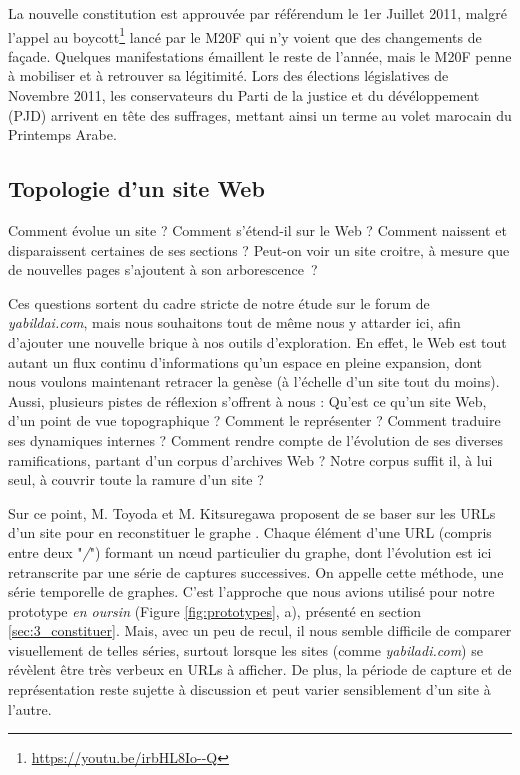 \documentclass[symmetric,justified,marginals=raggedouter]{tufte-book}
\begin{document}
La nouvelle constitution est approuvée par référendum le 1er Juillet 2011, malgré l'appel au boycott\footnote{\url{https://youtu.be/irbHL8Io--Q}} lancé par le M20F qui n'y voient que des changements de façade. Quelques manifestations émaillent le reste de l'année, mais le M20F penne à mobiliser et à retrouver sa légitimité. Lors des élections législatives de Novembre 2011, les conservateurs du Parti de la justice et du dévéloppement (PJD) arrivent en tête des suffrages, mettant ainsi un terme au volet marocain du Printemps Arabe.

\subsection{Topologie d'un site Web}

\noindent Comment évolue un site ? Comment s'étend-il sur le Web ? Comment naissent et disparaissent certaines de ses sections ? Peut-on voir un site croitre, à mesure que de nouvelles pages s'ajoutent à son arborescence~? 

Ces questions sortent du cadre stricte de notre étude sur le forum de \textit{yabildai.com}, mais nous souhaitons tout de même nous y attarder ici, afin d'ajouter une nouvelle brique à nos outils d'exploration. En effet, le Web est tout autant un flux continu d'informations qu'un espace en pleine expansion, dont nous voulons maintenant retracer la genèse (à l'échelle d'un site tout du moins). Aussi, plusieurs pistes de réflexion s'offrent à nous : Qu'est ce qu'un site Web, d'un point de vue topographique ? Comment le représenter ? Comment traduire ses dynamiques internes ? Comment rendre compte de l'évolution de ses diverses ramifications, partant d'un corpus d'archives Web ? Notre corpus suffit il, à lui seul, à couvrir toute la ramure d'un site ? 

Sur ce point, M. Toyoda et M. Kitsuregawa proposent de se baser sur les URLs d'un site pour en reconstituer le graphe \citep{toyoda_extracting_2003,toyoda_system_2005}. Chaque élément d'une URL (compris entre deux "\textit{/}") formant un nœud particulier du graphe, dont l'évolution est ici retranscrite par une série de captures successives. On appelle cette méthode, une série temporelle de graphes. C'est l'approche que nous avions utilisé pour notre prototype \textit{en oursin} (Figure \ref{fig:prototypes}, a), présenté en section \ref{sec:3_constituer}. Mais, avec un peu de recul, il nous semble difficile de comparer visuellement de telles séries, surtout lorsque les sites (comme \textit{yabiladi.com}) se révèlent être très verbeux en URLs à afficher. De plus, la période de capture et de représentation reste sujette à discussion et peut varier sensiblement d'un site à l'autre.
\end{document}
